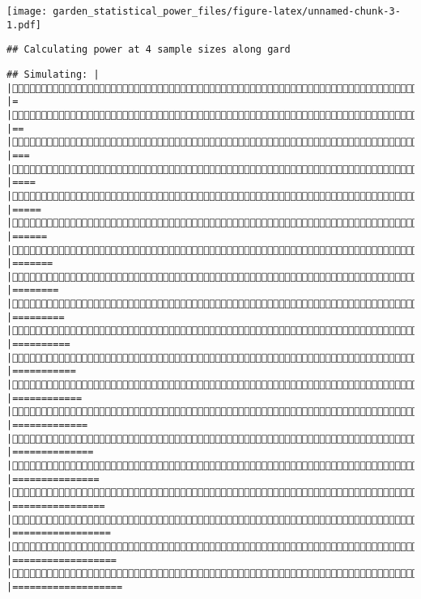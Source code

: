 \documentclass[]{article}
\begin{document}
\texttt{[image: garden\_statistical\_power\_files/figure-latex/unnamed-chunk-3-1.pdf]}

\begin{verbatim}
## Calculating power at 4 sample sizes along gard
\end{verbatim}

\begin{verbatim}
## Simulating: |                                                             |Simulating: |=                                                            |Simulating: |==                                                           |Simulating: |===                                                          |Simulating: |====                                                         |Simulating: |=====                                                        |Simulating: |======                                                       |Simulating: |=======                                                      |Simulating: |========                                                     |Simulating: |=========                                                    |Simulating: |==========                                                   |Simulating: |===========                                                  |Simulating: |============                                                 |Simulating: |=============                                                |Simulating: |==============                                               |Simulating: |===============                                              |Simulating: |================                                             |Simulating: |=================                                            |Simulating: |==================                                           |Simulating: |===================                                      
\end{verbatim}
\end{document}
